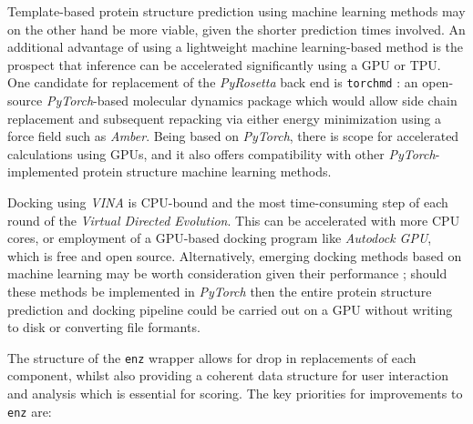 \documentclass[16pt]{book}
\begin{document}
Template-based protein structure prediction using machine learning methods may on the other hand be more viable, given the shorter prediction times involved.
An additional advantage of using a lightweight machine learning-based method is the prospect that inference can be accelerated significantly using a GPU or TPU.
One candidate for replacement of the \textit{PyRosetta} back end is \texttt{torchmd} \cite{doerr2021torchmd}: an open-source \textit{PyTorch}-based molecular dynamics package which would allow side chain replacement and subsequent repacking via either energy minimization using a force field such as \textit{Amber}\cite{wang2004development}.
Being based on \textit{PyTorch}, there is scope for accelerated calculations using GPUs, and it also offers compatibility with other \textit{PyTorch}-implemented protein structure machine learning methods.

Docking using \textit{VINA} is CPU-bound and the most time-consuming step of each round of the \textit{Virtual Directed Evolution}.
This can be accelerated with more CPU cores, or employment of a GPU-based docking program like \textit{Autodock GPU}\cite{santos2021accelerating}, which is free and open source.
Alternatively, emerging docking methods based on machine learning may be worth consideration given their performance \cite{doerr2021torchmd}; should these methods be implemented in \textit{PyTorch} then the entire protein structure prediction and docking pipeline could be carried out on a GPU without writing to disk or converting file formants.

The structure of the \texttt{enz} wrapper allows for drop in replacements of each component, whilst also providing a coherent data structure for user interaction and analysis which is essential for scoring.
The key priorities for improvements to \texttt{enz} are:
\end{document}
